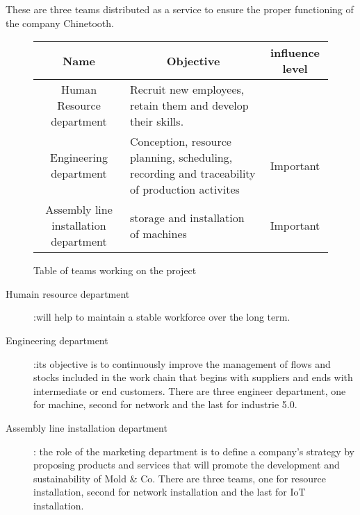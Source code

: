 These are three teams distributed as a service to ensure the proper functioning of the company Chinetooth.

\begin{figure}[h]
\centering
\begin{tabular}{| c | p{6cm} | c |}
    \hline
    \rowcolor{heading-color}Name & \multicolumn{1}{c|}{Objective} & influence level \\
    \hline
    Human Resource department & Recruit new employees, retain them and develop their skills. & \\
    \hline
    Engineering department & Conception, resource planning, scheduling, recording and traceability of production activites & Important \\
    \hline 
    Assembly line installation department & storage and installation of machines & Important \\
    \hline 
\end{tabular}
\caption{Table of teams working on the project}
\end{figure}

\begin{description}
    \item[Humain resource department]:will help to maintain a stable workforce over the long term.
    \item[Engineering department]:its objective is to continuously improve the management of flows and stocks included in the work chain that begins with suppliers and ends with intermediate or end customers. There are three engineer department, one for machine, second for network and the last for industrie 5.0.
    \item[Assembly line installation department]: the role of the marketing department is to define a company's strategy by proposing products and services that will promote the development and sustainability of Mold \& Co. There are three teams, one for resource installation, second for network installation and the last for IoT installation.
\end{description} 